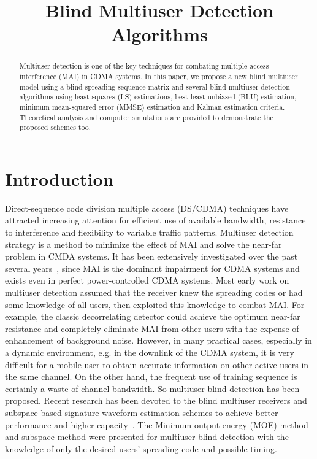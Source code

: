 \documentclass[a4paper,11pt,fleqn]{article}
\title{Blind Multiuser Detection Algorithms}
\date{}
\author{}
\begin{document}
\maketitle

\begin{abstract}
Multiuser detection is one of the key techniques for combating
multiple access interference (MAI) in CDMA systems. In this paper,
we propose a new blind multiuser model using a blind spreading
sequence matrix and several blind multiuser detection algorithms
using least-squares (LS) estimations, best least unbiased (BLU)
estimation, minimum mean-squared error (MMSE) estimation and
Kalman estimation criteria. Theoretical analysis and computer
simulations are provided to demonstrate the proposed schemes too.
\end{abstract}

\section{Introduction}

Direct-sequence code division multiple access (DS/CDMA) techniques
have attracted increasing attention for efficient use of available
bandwidth, resistance to interference and flexibility to variable
traffic patterns. Multiuser detection strategy is a method to
minimize the effect of MAI and solve the near-far problem in CMDA
systems. It has been extensively investigated over the past
several years~\cite{Verd98}, since MAI is the dominant impairment
for CDMA systems and exists even in perfect power-controlled CDMA
systems. Most early work on multiuser detection assumed that the
receiver knew the spreading codes or had some knowledge of all
users, then exploited this knowledge to combat MAI. For example,
the classic decorrelating detector could achieve the optimum
near-far resistance and completely eliminate MAI from other users
with the expense of enhancement of background noise. However, in
many practical cases, especially in a dynamic environment, e.g. in
the downlink of the CDMA system, it is very difficult for a mobile
user to obtain accurate information on other active users in the
same channel. On the other hand, the frequent use of training
sequence is certainly a waste of channel bandwidth. So multiuser
blind detection has been proposed. Recent research has been
devoted to the blind multiuser receivers and subspace-based
signature waveform estimation schemes to achieve better
performance and higher capacity~\cite{Honi95, Poor97, Wang98,
Torl97, Liu96}. The Minimum output energy (MOE) method and
subspace method were presented for multiuser blind detection with
the knowledge of only the desired users' spreading code and
possible timing.
\end{document}

